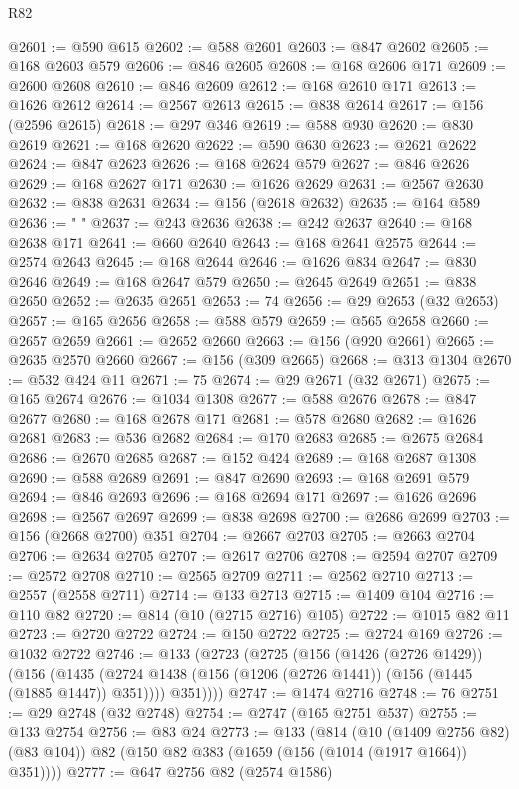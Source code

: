 \begin{lexlean}{R82}
\begin{coremodule}
@2601 := @590 @615
@2602 := @588 @2601
@2603 := @847 @2602
@2605 := @168 @2603 @579
@2606 := @846 @2605
@2608 := @168 @2606 @171
@2609 := @2600 @2608
@2610 := @846 @2609
@2612 := @168 @2610 @171
@2613 := @1626 @2612
@2614 := @2567 @2613
@2615 := @838 @2614
@2617 := @156 (@2596 @2615)
@2618 := @297 @346
@2619 := @588 @930
@2620 := @830 @2619
@2621 := @168 @2620
@2622 := @590 @630
@2623 := @2621 @2622
@2624 := @847 @2623
@2626 := @168 @2624 @579
@2627 := @846 @2626
@2629 := @168 @2627 @171
@2630 := @1626 @2629
@2631 := @2567 @2630
@2632 := @838 @2631
@2634 := @156 (@2618 @2632)
@2635 := @164 @589
@2636 := " "
@2637 := @243 @2636
@2638 := @242 @2637
@2640 := @168 @2638 @171
@2641 := @660 @2640
@2643 := @168 @2641 @2575
@2644 := @2574 @2643
@2645 := @168 @2644
@2646 := @1626 @834
@2647 := @830 @2646
@2649 := @168 @2647 @579
@2650 := @2645 @2649
@2651 := @838 @2650
@2652 := @2635 @2651
@2653 := 74
@2656 := @29 @2653 (@32 @2653)
@2657 := @165 @2656
@2658 := @588 @579
@2659 := @565 @2658
@2660 := @2657 @2659
@2661 := @2652 @2660
@2663 := @156 (@920 @2661)
@2665 := @2635 @2570 @2660
@2667 := @156 (@309 @2665)
@2668 := @313 @1304
@2670 := @532 @424 @11
@2671 := 75
@2674 := @29 @2671 (@32 @2671)
@2675 := @165 @2674
@2676 := @1034 @1308
@2677 := @588 @2676
@2678 := @847 @2677
@2680 := @168 @2678 @171
@2681 := @578 @2680
@2682 := @1626 @2681
@2683 := @536 @2682
@2684 := @170 @2683
@2685 := @2675 @2684
@2686 := @2670 @2685
@2687 := @152 @424
@2689 := @168 @2687 @1308
@2690 := @588 @2689
@2691 := @847 @2690
@2693 := @168 @2691 @579
@2694 := @846 @2693
@2696 := @168 @2694 @171
@2697 := @1626 @2696
@2698 := @2567 @2697
@2699 := @838 @2698
@2700 := @2686 @2699
@2703 := @156 (@2668 @2700) @351
@2704 := @2667 @2703
@2705 := @2663 @2704
@2706 := @2634 @2705
@2707 := @2617 @2706
@2708 := @2594 @2707
@2709 := @2572 @2708
@2710 := @2565 @2709
@2711 := @2562 @2710
@2713 := @2557 (@2558 @2711)
@2714 := @133 @2713
@2715 := @1409 @104
@2716 := @110 @82
@2720 := @814 (@10 (@2715 @2716) @105)
@2722 := @1015 @82 @11
@2723 := @2720 @2722
@2724 := @150 @2722
@2725 := @2724 @169
@2726 := @1032 @2722
@2746 := @133
    (@2723
      (@2725
        (@156
          (@1426 (@2726 @1429))
          (@156
            (@1435 (@2724 @1438 (@156 (@1206 (@2726 @1441)) (@156 (@1445 (@1885 @1447)) @351))))
            @351))))
@2747 := @1474 @2716
@2748 := 76
@2751 := @29 @2748 (@32 @2748)
@2754 := @2747 (@165 @2751 @537)
@2755 := @133 @2754
@2756 := @83 @24
@2773 := @133
    (@814
      (@10 (@1409 @2756 @82) (@83 @104))
      @82
      (@150 @82 @383 (@1659 (@156 (@1014 (@1917 @1664)) @351))))
@2777 := @647 @2756 @82 (@2574 @1586)

\end{coremodule}
\end{lexlean}
